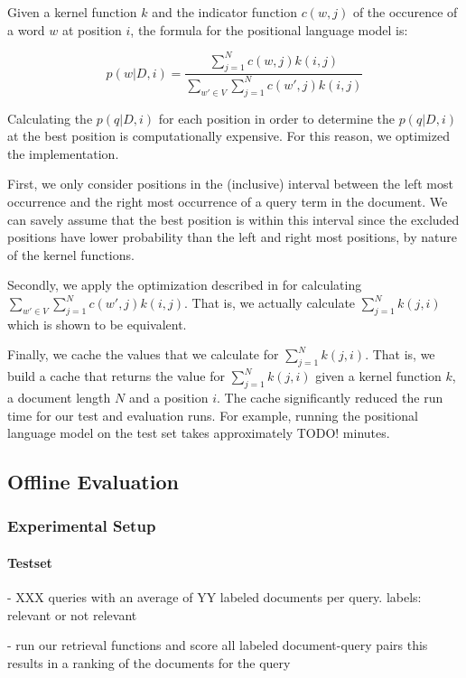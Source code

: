 Given a kernel function $k$ and the indicator function 
$c(w,j)$ of the occurence of a word $w$ at position $i$,
the formula for the positional language model is:

\begin{equation*}
p(w|D,i) = \frac{\sum_{j=1}^N c(w,j)k(i,j)}
{\sum_{w' \in V} \sum_{j=1}^N c(w',j)k(i,j)} 
\end{equation*}

Calculating the $p(q|D,i)$ for each position
in order to determine the $p(q|D,i)$ at the 
best position is computationally expensive.
For this reason, we optimized the implementation.

First, we only consider positions in the (inclusive) interval
between the left most occurrence and the right most
occurrence of a query term in the document.
We can savely assume that the best position is within this interval
since the excluded positions have lower probability
than the left and right most positions,
by nature of the kernel functions.

Secondly, we apply the optimization 
described in \cite{PLM} for calculating
$\sum_{w' \in V} \sum_{j=1}^N c(w',j)k(i,j)$.
That is, we actually calculate 
$\sum_{j=1}^N k(j,i)$ which is shown to be equivalent.

Finally, we cache the values that we calculate for 
$\sum_{j=1}^N k(j,i)$. That is,
we build a cache that returns the
value for $\sum_{j=1}^N k(j,i)$ given
a kernel function $k$, a document length $N$
and a position $i$. The cache
significantly reduced the run time
for our test and evaluation runs.
For example, running the positional
language model on the test set takes
approximately TODO! minutes.


\subsection{Offline Evaluation}
\label{LexicalModels:Evaluation}

\subsubsection{Experimental Setup}

\paragraph{Testset}
- XXX queries with an average of YY labeled documents per query.
labels: relevant or not relevant

- run our retrieval functions and score all labeled document-query pairs
this results in a ranking of the documents for the query

